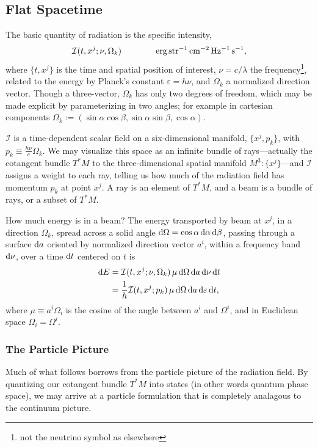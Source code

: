 \subsection{Flat Spacetime}
The basic quantity of radiation is the specific intensity,
\begin{equation}
  \mathcal{I}(t,x^j;\nu,\Omega_k) \qquad \qquad
  {\rm erg}\,{\rm str}^{-1}\,{\rm cm}^{-2}\,{\rm Hz}^{-1}\,{\rm s}^{-1}, \nonumber
\end{equation}
where $\{t,x^j\}$ is the time and spatial position of interest,
$\nu=c/\lambda$ the frequency\footnote{not the neutrino symbol as elsewhere},
related to the energy by Planck's constant $\varepsilon=h\nu$, and
$\Omega_k$ a normalized direction vector. Though a three-vector, $\Omega_k$
has only two degrees of freedom, which may be made explicit by parameterizing
in two angles; for example in cartesian components
$\Omega_k:=(\sin\alpha\cos\beta,\sin\alpha\sin\beta,\cos\alpha)$.

$\mathcal{I}$ is a time-dependent scalar field on a six-dimensional manifold,
$\{x^j,p_k\}$, with $p_k\equiv\frac{h\nu}{c}\Omega_k$.
We may visualize this space as an infinite bundle of rays---actually the
cotangent bundle $T^*M$ to the three-dimensional
spatial manifold $M^3:\{x^j\}$---and $\mathcal{I}$
assigns a weight to each ray, telling us how much of the radiation field has
momentum $p_k$ at point $x^j$. A ray is an element of $T^*M$,
and a beam is a bundle of rays, or a subset of $T^*M$.

How much energy is in a beam?
The energy transported by beam at $x^j$,
in a direction $\Omega_k$,
spread across a solid angle $\mathrm{d}\Omega=\cos\alpha\,\mathrm{d}\alpha\,\mathrm{d}\beta$,
passing through a surface $\mathrm{d} a$
oriented by normalized direction vector $a^i$,
within a frequency band $\mathrm{d} \nu$,
over a time $\mathrm{d} t$ centered on $t$ is
\begin{align}
  \label{eqn:beam_energy_I_nu}
  \mathrm{d} E &= \mathcal{I}(t,x^j;\nu,\Omega_k)\,
  \mu\, \mathrm{d}\Omega\, \mathrm{d} a\, \mathrm{d}\nu\, \mathrm{d} t \\
  \label{eqn:beam_energy_I_eps}
  &= \frac{1}{h} \mathcal{I}(t,x^j;p_k)\,
  \mu\, \mathrm{d}\Omega\, \mathrm{d} a\, \mathrm{d}\varepsilon\, \mathrm{d} t,
\end{align}
where $\mu\equiv a^i\Omega_i$ is the cosine of the angle between $a^i$ and
$\Omega^i$, and in Euclidean space $\Omega_i=\Omega^i$.

\subsubsection{The Particle Picture}
Much of what follows borrows from the particle picture of the radiation field.
By quantizing our cotangent bundle $T^*M$ into states (in other words
quantum phase space), we may arrive at a particle formulation that is completely
analagous to the continuum picture.

